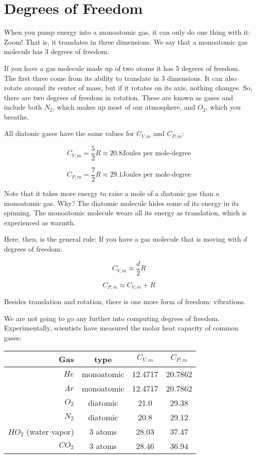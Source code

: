 \section{Degrees of Freedom}

When you pump energy into a monoatomic gas,  it can only do one thing with it: Zoom!  That is,  it translates in three dimensions.  
We say that a monoatomic gas molecule has 3 degrees of freedom.

If you have a gas molecule made up of two atoms it has 5 degrees of freedom.   The first three come from its ability to translate in 3 dimensions.    
It can also rotate around its center of mass, but if it rotates on its axis, nothing changes.  
So, there are two degrees of freedom in rotation.  These are known as  gases and include both $N_2$, which makes up most of 
our atmosphere, and $O_2$, which you breathe.

All diatonic gases have the same values for $C_{V,m}$ and $C_{P,m}$:

$$C_{V,m} = \frac{5}{2}R \approx 20.8 \text{Joules per mole-degree}$$

$$C_{P,m} = \frac{7}{2}R \approx 29.1 \text{Joules per mole-degree}$$

Note that it takes more energy to raise a mole of a diatonic gas than a monoatomic gas.   Why?  The diatomic molecule hides some of its energy in its spinning.  The monoatomic molecule wears all its energy as translation, which is experienced as warmth.

Here, then, is the general rule:  If you have a gas molecule that is moving with $d$ degrees of freedom:

$$C_{V,m} \approx  \frac{d}{2}R$$

$$C_{P,m} \approx C_{V,m} + R$$

Besides translation and rotation, there is one more form of freedom: vibrations. 

We are not going to go any further into computing degrees of freedom.  Experimentally,  scientists have measured the molar heat capacity of common gases:

\begin{tabular}{r|c|c| c}
Gas & type & $C_{V,m}$ & $C_{P,m}$ \\
\hline
$He$ &  monoatomic & 12.4717 & 20.7862 \\
$Ar$ & monoatomic & 12.4717 & 20.7862 \\
$O_2$ & diatomic & 21.0 & 29.38 \\
$N_2$ & diatomic & 20.8 & 29.12 \\
$HO_2$ (water vapor) & 3 atoms &  28.03 & 37.47 \\
$CO_2$ & 3 atoms & 28.46 & 36.94\\
\end{tabular}

